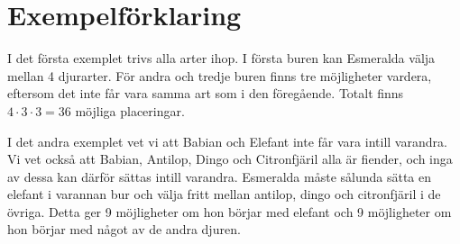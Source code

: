 \section*{Exempelförklaring}

I det första exemplet trivs alla arter ihop. I första buren kan Esmeralda välja mellan 4 djurarter. För andra och tredje buren finns tre möjligheter vardera, eftersom det inte får vara samma art som i den föregående. Totalt finns $4\cdot 3\cdot 3=36$ möjliga placeringar.

I det andra exemplet vet vi att Babian och Elefant inte får vara intill varandra. Vi vet också att Babian, Antilop, Dingo och Citronfjäril alla är fiender, och inga av dessa kan därför sättas intill varandra. Esmeralda måste sålunda sätta en elefant i varannan bur och välja fritt mellan antilop, dingo och citronfjäril i de övriga. Detta ger 9 möjligheter om hon börjar med elefant och 9 möjligheter om hon börjar med något av de andra djuren.
